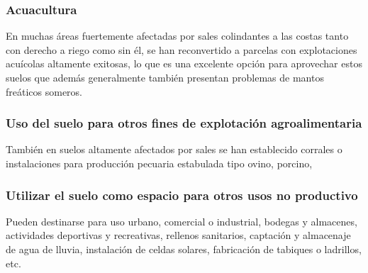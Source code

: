 \subsubsection{Acuacultura}

En muchas áreas fuertemente afectadas por sales colindantes a las costas tanto con derecho a riego como sin él, se han reconvertido a parcelas con explotaciones acuícolas altamente exitosas, lo que es una excelente opción para aprovechar estos suelos que además generalmente también presentan problemas de mantos freáticos someros.

\subsubsection{Uso del suelo para otros fines de explotación agroalimentaria}
También en suelos altamente afectados por sales se han establecido corrales o instalaciones para producción pecuaria estabulada tipo ovino, porcino,

\subsubsection{Utilizar el suelo como espacio para otros usos no productivo}
Pueden destinarse para uso urbano, comercial o industrial, bodegas y almacenes, actividades deportivas y recreativas, rellenos sanitarios, captación y almacenaje de agua de lluvia, instalación de celdas solares, fabricación de tabiques o ladrillos, etc.